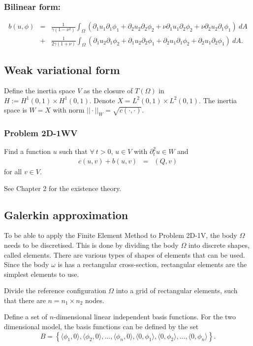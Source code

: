 \documentclass[../../main.tex]{subfiles}
\begin{document}
\subsubsection{Bilinear form:}
\begin{align}
	b(u,\phi) & = & \frac{1}{\gamma(1-\nu^2)}\int_{\Omega} (\partial_1 u_1 \partial_1 \phi_1 + \partial_2 u_2 \partial _2 \phi_2 + \nu\partial_1 u_1 \partial_2\phi_2 + \nu \partial_2 u_2 \partial_1 \phi_1 ) \ dA \nonumber\\
	& + & \frac{1}{2\gamma(1+\nu)}\int_{\Omega} (\partial_1 u_2 \partial_1 \phi_2 + \partial_1 u_2 \partial_2 \phi_1 + \partial_2 u_1 \partial_1\phi_2 + \partial_2 u_1 \partial_2\phi_1) \ dA.
\end{align}

\subsection{Weak variational form}
Define the inertia space $V$ as the closure of $T(\Omega)$ in $H := H^1(0,1)\times H^1(0,1)$. Denote $X = L^2(0,1)\times L^2(0,1)$. The inertia space is $W  = X$ with norm $||\cdot||_W = \sqrt{c(\cdot,\cdot)}$.

\subsubsection{Problem 2D-1WV}
Find a function $u$ such that $\forall \ t > 0$, $u \in V$ with $\partial_t^2 u \in W$ and
\begin{eqnarray*}
	c(u,v) + b(u,v) & = & (Q,v)
\end{eqnarray*}
for all $v\in V$.

See Chapter 2 for the existence theory.

\subsection{Galerkin approximation}\label{2d_FEM_G}
To be able to apply the Finite Element Method to Problem 2D-1V, the body $\Omega$ needs to be discretised. This is done by dividing the body $\Omega$ into discrete shapes, called elements. There are various types of shapes of elements that can be used. Since the body $\omega$ is has a rectangular cross-section, rectangular elements are the simplest elements to use.

Divide the reference configuration $\Omega$ into a grid of rectangular elements, such that there are $n = n_1\times n_2$ nodes.

Define a set of $n$-dimensional linear independent basis functions. For the two dimensional model, the basis functions can be defined by the set $$B = \left\{\langle\phi_1, 0\rangle, \langle\phi_2, 0\rangle,...,\langle\phi_{n}, 0 \rangle,\langle 0,\phi_1\rangle,\langle 0 ,\phi_2\rangle,...,\langle 0,\phi_{n}\rangle \right\}.$$ 
\end{document}
